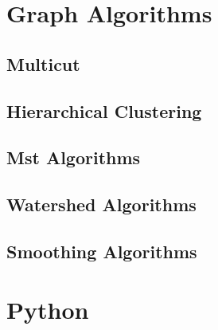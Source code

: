 
\section{Graph Algorithms} \label{sec:graph_graph_algorithms}

    \subsection{Multicut}

    \subsection{Hierarchical Clustering}

    \subsection{Mst Algorithms}

    \subsection{Watershed Algorithms}

    \subsection{Smoothing Algorithms}





\section{Python}




